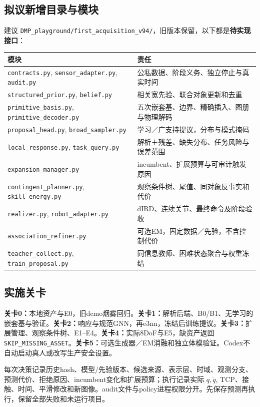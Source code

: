 \documentclass[UTF8,fontset=fandol,11pt,a4paper]{ctexart}
\theoremstyle{plain}
\theoremstyle{definition}
\theoremstyle{remark}
\numberwithin{equation}{section}
\newcommand{\code}[1]{\begingroup\small\nolinkurl{#1}\endgroup}
\begin{document}
\subsection{拟议新增目录与模块}
建议 \code{DMP_playground/first_acquisition_v94/}，旧版本保留，以下都是\textbf{待实现接口}：
\begin{longtable}{P{45mm}P{101mm}}
\toprule 模块 & 责任\\\midrule\endhead
\code{contracts.py}, \code{sensor_adapter.py}, \code{audit.py} & 公私数据、阶段义务、独立停止与真实时间\\
\code{structured_prior.py}, \code{belief.py} & 相关宽先验、联合对象更新和去重\\
\code{primitive_basis.py}, \code{primitive_decoder.py} & 五次嵌套基、边界、精确插入、图册与物理解码\\
\code{proposal_head.py}, \code{broad_sampler.py} & 学习／广支持提议，分布与模式掩码\\
\code{local_response.py}, \code{task_query.py} & 解析＋残差、缺失分布、任务风险与误差范围\\
\code{expansion_manager.py} & incumbent、扩展预算与可审计触发原因\\
\code{contingent_planner.py}, \code{skill_energy.py} & 观察条件树、尾值、同对象反事实和代价\\
\code{realizer.py}, \code{robot_adapter.py} & dIRD、连续关节、最终命令及阶段验收\\
\code{association_refiner.py} & 可选EM，固定数据／先验，不含控制代价\\
\code{teacher_collect.py}, \code{train_proposal.py} & 同信息教师、困难状态聚合与权重冻结\\\bottomrule
\end{longtable}

\subsection{实施关卡}
\textbf{关卡0：}本地资产与E0，旧demo烟雾回归。\textbf{关卡1：}解析后端、B0/B1、无学习的嵌套基与验证。\textbf{关卡2：}响应与规范GNN，再e3nn，冻结后训练提议。\textbf{关卡3：}扩展管理、观察条件树、E1--E4。\textbf{关卡4：}实际8DoF与E5，缺资产返回 \code{SKIP_MISSING_ASSET}。\textbf{关卡5：}可选生成器／EM消融和独立体模验证。Codex不自动启动真人或改写生产安全设置。

每次决策记录历史hash、模型/先验版本、候选来源、表示层、时域、观测分支、预测代价、拒绝原因、incumbent变化和扩展预算；执行记录实际 $q,\dot q$, TCP、接触、时间、平滑修改和新图像。audit文件与policy进程权限分开。先保存预测再执行，保留全部失败和未运行项目。
\end{document}
